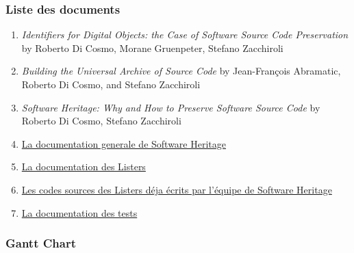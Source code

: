 \documentclass[12pt,a4paper]{report}
\begin{document}
\subsubsection{Liste des documents}
\begin{enumerate}
  \item \textit{Identifiers for Digital Objects: the Case of Software Source Code Preservation} by Roberto Di Cosmo, Morane Gruenpeter, Stefano Zacchiroli
  \item \textit{Building the Universal Archive of Source Code} by Jean-François Abramatic, Roberto Di Cosmo, and Stefano Zacchiroli
  \item \textit{Software Heritage: Why and How to Preserve Software Source Code} by Roberto Di Cosmo, Stefano Zacchiroli
  \item \href{https://docs.softwareheritage.org/devel/}{La documentation generale de Software Heritage}
  \item \href{https://www.softwareheritage.org/2017/03/24/list-the-content-of-your-favorite-forge-in-just-a-few-steps/}{La documentation des Listers}
  \item \href{https://forge.softwareheritage.org/source/swh-lister/}{Les codes sources des Listers déja écrits par l'équipe de Software Heritage}
  \item \href{https://docs.softwareheritage.org/devel/getting-started.html#getting-started}{La documentation des tests}
\end{enumerate}

\newpage

\subsubsection{Gantt Chart}
\begin{figure}[!ht]
  \centering
  
\end{figure}
\end{document}

